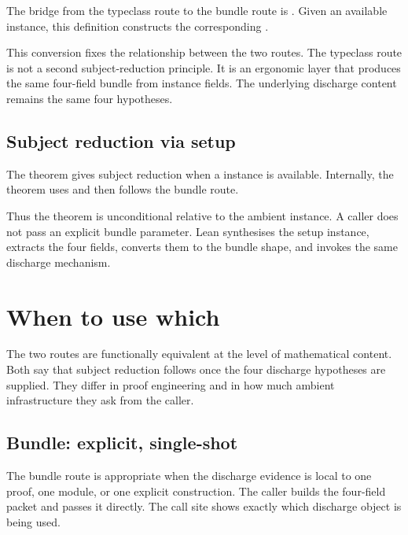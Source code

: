 The bridge from the typeclass route to the bundle route is
.
Given an available
instance, this definition constructs the corresponding
.

This conversion fixes the relationship between the two routes.
The typeclass route is not a second subject-reduction principle.
It is an ergonomic layer that produces the same four-field bundle from
instance fields.
The underlying discharge content remains the same four hypotheses.

\subsection{Subject reduction via setup}
\label{subsec:sr-discharge-routes-subject-reduction-via-setup}

The theorem
gives subject reduction when a
instance is available.
Internally, the theorem uses
and then follows the bundle route.

Thus the theorem is unconditional relative to the ambient instance.
A caller does not pass an explicit bundle parameter.
Lean synthesises the setup instance, extracts the four fields, converts
them to the bundle shape, and invokes the same discharge mechanism.

\section{When to use which}
\label{sec:sr-discharge-routes-when-to-use-which}

The two routes are functionally equivalent at the level of mathematical
content.
Both say that subject reduction follows once the four discharge
hypotheses are supplied.
They differ in proof engineering and in how much ambient infrastructure
they ask from the caller.

\subsection{Bundle: explicit, single-shot}
\label{subsec:sr-discharge-routes-bundle-single-shot}

The bundle route is appropriate when the discharge evidence is local to
one proof, one module, or one explicit construction.
The caller builds the four-field packet and passes it directly.
The call site shows exactly which discharge object is being used.

